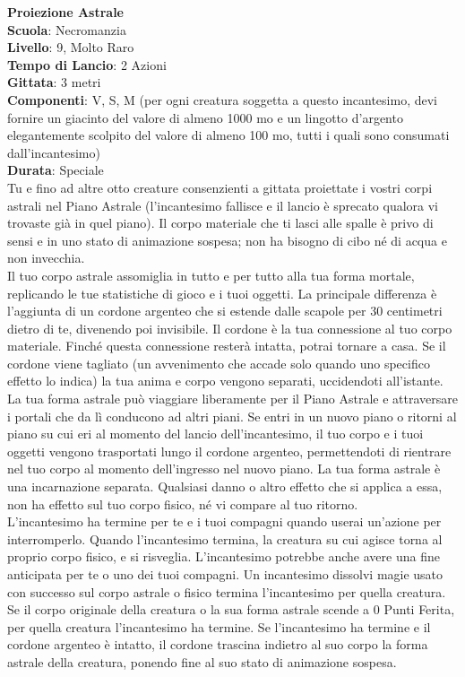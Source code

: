 \begin{multicols}{2}
\medskip\textbf{Proiezione Astrale}\\
\textbf{Scuola}: Necromanzia\\
\textbf{Livello}: 9, Molto Raro\\
\textbf{Tempo di Lancio}: 2 Azioni\\
\textbf{Gittata}: 3 metri\\
\textbf{Componenti}: V, S, M (per ogni creatura soggetta a questo incantesimo, devi fornire un giacinto del valore di almeno 1000 mo e un lingotto d'argento elegantemente scolpito del valore di almeno 100 mo, tutti i quali sono consumati dall'incantesimo)\\
\textbf{Durata}: Speciale\\
Tu e fino ad altre otto creature consenzienti a gittata proiettate i vostri corpi astrali nel Piano Astrale (l'incantesimo fallisce e il lancio è sprecato qualora vi trovaste già in quel piano). Il corpo materiale che ti lasci alle spalle è privo di sensi e in uno stato di animazione sospesa; non ha bisogno di cibo né di acqua e non invecchia.\\
Il tuo corpo astrale assomiglia in tutto e per tutto alla tua forma mortale, replicando le tue statistiche di gioco e i tuoi oggetti. La principale differenza è l'aggiunta di un cordone argenteo che si estende dalle scapole per 30 centimetri dietro di te, divenendo poi invisibile. Il cordone è la tua connessione al tuo corpo materiale. Finché questa connessione resterà intatta, potrai tornare a casa. Se il cordone viene tagliato (un avvenimento che accade solo quando uno specifico effetto lo indica) la tua anima e corpo vengono separati, uccidendoti all'istante.\\
La tua forma astrale può viaggiare liberamente per il Piano Astrale e attraversare i portali che da lì conducono ad altri piani. Se entri in un nuovo piano o ritorni al piano su cui eri al momento del lancio dell'incantesimo, il tuo corpo e i tuoi oggetti vengono trasportati lungo il cordone argenteo, permettendoti di rientrare nel tuo corpo al momento dell'ingresso nel nuovo piano. La tua forma astrale è una incarnazione separata. Qualsiasi danno o altro effetto che si applica a essa, non ha effetto sul tuo corpo fisico, né vi compare al tuo ritorno.\\
L'incantesimo ha termine per te e i tuoi compagni quando userai un'azione per interromperlo. Quando l'incantesimo termina, la creatura su cui agisce torna al proprio corpo fisico, e si risveglia. L'incantesimo potrebbe anche avere una fine anticipata per te o uno dei tuoi compagni. Un incantesimo dissolvi magie usato con successo sul corpo astrale o fisico termina l'incantesimo per quella creatura. Se il corpo originale della creatura o la sua forma astrale scende a 0 Punti Ferita, per quella creatura l'incantesimo ha termine. Se l'incantesimo ha termine e il cordone argenteo è intatto, il cordone trascina indietro al suo corpo la forma astrale della creatura, ponendo fine al suo stato di animazione sospesa.\\

\end{multicols}
